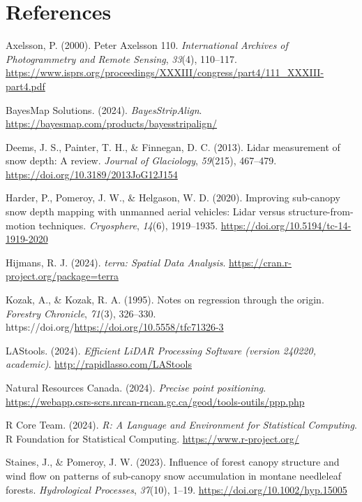 \documentclass[
  letterpaper,
  DIV=11,
  numbers=noendperiod]{scrartcl}
\newlength{\cslhangindent}
\newenvironment{CSLReferences}[2] %
 {\begin{list}{}{%
  \setlength{\itemindent}{0pt}
  \setlength{\leftmargin}{0pt}
  \setlength{\parsep}{0pt}
  \ifodd #1
   \setlength{\leftmargin}{\cslhangindent}
   \setlength{\itemindent}{-1\cslhangindent}
  \fi
  \setlength{\itemsep}{#2\baselineskip}}}
 {\end{list}}
\begin{document}
\pagebreak

\section*{References}\label{references}

\label{refs}
\begin{CSLReferences}{1}{0}
Axelsson, P. (2000). {Peter Axelsson 110}. \emph{International Archives
of Photogrammetry and Remote Sensing}, \emph{33}(4), 110--117.
\url{https://www.isprs.org/proceedings/XXXIII/congress/part4/111_XXXIII-part4.pdf}

BayesMap Solutions. (2024). \emph{{BayesStripAlign}}.
\url{https://bayesmap.com/products/bayesstripalign/}

Deems, J. S., Painter, T. H., \& Finnegan, D. C. (2013). {Lidar
measurement of snow depth: A review}. \emph{Journal of Glaciology},
\emph{59}(215), 467--479. \url{https://doi.org/10.3189/2013JoG12J154}

Harder, P., Pomeroy, J. W., \& Helgason, W. D. (2020). {Improving
sub-canopy snow depth mapping with unmanned aerial vehicles: Lidar
versus structure-from-motion techniques}. \emph{Cryosphere},
\emph{14}(6), 1919--1935. \url{https://doi.org/10.5194/tc-14-1919-2020}

Hijmans, R. J. (2024). \emph{{terra: Spatial Data Analysis}}.
\url{https://cran.r-project.org/package=terra}

Kozak, A., \& Kozak, R. A. (1995). {Notes on regression through the
origin}. \emph{Forestry Chronicle}, \emph{71}(3), 326--330.
https://doi.org/\url{https://doi.org/10.5558/tfc71326-3}

LAStools. (2024). \emph{{Efficient LiDAR Processing Software (version
240220, academic)}}. \url{http://rapidlasso.com/LAStools}

Natural Resources Canada. (2024). \emph{{Precise point positioning}}.
\url{https://webapp.csrs-scrs.nrcan-rncan.gc.ca/geod/tools-outils/ppp.php}

R Core Team. (2024). \emph{{R: A Language and Environment for
Statistical Computing}}. R Foundation for Statistical Computing.
\url{https://www.r-project.org/}

Staines, J., \& Pomeroy, J. W. (2023). {Influence of forest canopy
structure and wind flow on patterns of sub-canopy snow accumulation in
montane needleleaf forests}. \emph{Hydrological Processes},
\emph{37}(10), 1--19. \url{https://doi.org/10.1002/hyp.15005}

\end{CSLReferences}
\end{document}
